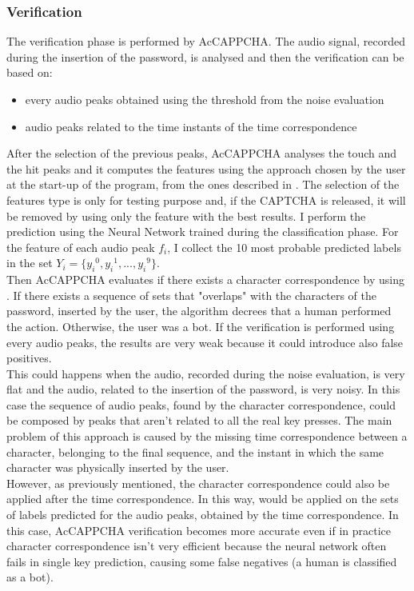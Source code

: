 \subsubsection{Verification}
The verification phase is performed by AcCAPPCHA. The audio signal, recorded during the insertion of the password, is analysed and then the verification can be based on:
\begin{itemize}
\item{every audio peaks obtained using the threshold from the noise evaluation}
\item{audio peaks related to the time instants of the time correspondence}
\end{itemize}
After the selection of the previous peaks, AcCAPPCHA analyses the touch and the hit peaks and it computes the features using the approach chosen by the user at the start-up of the program, from the ones described in . The selection of the features type is only for testing purpose and, if the CAPTCHA is released, it will be removed by using only the feature with the best results. I perform the prediction using the Neural Network trained during the classification phase. For the feature of each audio peak $f_i$, I collect the 10 most probable predicted labels in the set $Y_i=\{ {y_i}^{0}, {y_i}^{1}, ..., {y_i}^{9}\}$.\\
Then AcCAPPCHA evaluates if there exists a character correspondence by using .
If there exists a sequence of sets that "overlaps" with the characters of the password, inserted by the user, the algorithm decrees that a human performed the action. Otherwise, the user was a bot. If the verification is performed using every audio peaks, the results are very weak because it could introduce also false positives.\\
This could happens when the audio, recorded during the noise evaluation, is very flat and the audio, related to the insertion of the password, is very noisy. In this case the sequence of audio peaks, found by the character correspondence, could be composed by peaks that aren't related to all the real key presses. The main problem of this approach is caused by the missing time correspondence between a character, belonging to the final sequence, and the instant in which the same character was physically inserted by the user.\\
However, as previously mentioned, the character correspondence could also be applied after the time correspondence. In this way,  would be applied on the sets of labels predicted for the audio peaks, obtained by the time correspondence. In this case, AcCAPPCHA verification becomes more accurate even if in practice character correspondence isn't very efficient because the neural network often fails in single key prediction, causing some false negatives (a human is classified as a bot).
